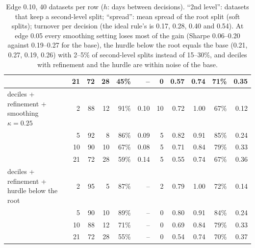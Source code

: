 \documentclass[11pt,a4paper]{article}
\newcommand{\1}{\mathbf{1}}
\begin{document}
\begin{table}[H]
\begin{tabular}{@{}l r rr r r r rr r r@{}}
 & 21 & 72 & 28 & 45\% & -- & 0 & 0.57 & 0.74 & 71\% & 0.35\\
\midrule
deciles + refinement + smoothing $\kappa=0.25$ & 2 & 88 & 12 & 91\% & 0.10 & 10 & 0.72 & 1.00 & 67\% & 0.12\\
 & 5 & 92 & 8 & 86\% & 0.09 & 5 & 0.82 & 0.91 & 85\% & 0.24\\
 & 10 & 90 & 10 & 67\% & 0.08 & 5 & 0.71 & 0.84 & 79\% & 0.33\\
 & 21 & 72 & 28 & 59\% & 0.14 & 5 & 0.55 & 0.74 & 67\% & 0.36\\
\midrule
deciles + refinement + hurdle below the root & 2 & 95 & 5 & 87\% & -- & 2 & 0.79 & 1.00 & 72\% & 0.14\\
 & 5 & 90 & 10 & 89\% & -- & 0 & 0.80 & 0.91 & 84\% & 0.24\\
 & 10 & 88 & 12 & 71\% & -- & 0 & 0.69 & 0.84 & 79\% & 0.33\\
 & 21 & 72 & 28 & 55\% & -- & 0 & 0.54 & 0.74 & 70\% & 0.37\\
\bottomrule
\end{tabular}
\caption{Edge 0.10, 40 datasets per row ($h$: days between decisions). ``2nd level'': datasets that keep a second-level split; ``spread'': mean spread of the root split (soft splits); turnover per decision (the ideal rule's is 0.17, 0.28, 0.40 and 0.54). At edge 0.05 every smoothing setting loses most of the gain (Sharpe 0.06--0.20 against 0.19--0.27 for the base), the hurdle below the root equals the base (0.21, 0.27, 0.19, 0.26) with 2--5\% of second-level splits instead of 15--30\%, and deciles with refinement and the hurdle are within noise of the base.}
\label{tab:options2}
\end{table}
\end{document}
